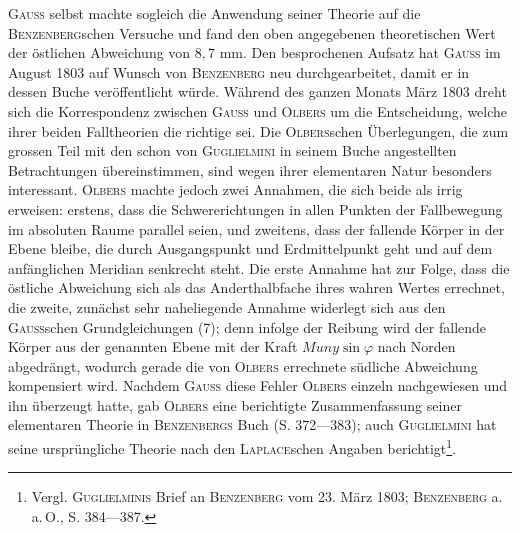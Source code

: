 \textsc{Gauss} selbst machte sogleich die Anwendung seiner Theorie auf die
\textsc{Benzenberg}schen Versuche und fand den oben angegebenen theoretischen Wert
der östlichen Abweichung von $8{,}7$ mm. Den besprochenen Aufsatz hat \textsc{Gauss}
im August 1803 auf Wunsch von \textsc{Benzenberg} neu durchgearbeitet, damit er
in dessen Buche veröffentlicht würde. Während des ganzen Monats März 1803
dreht sich die Korrespondenz zwischen \textsc{Gauss} und \textsc{Olbers} um die Entscheidung,
welche ihrer beiden Falltheorien die richtige sei. Die \textsc{Olbers}schen
Überlegungen, die zum grossen Teil mit den schon von \textsc{Guglielmini} in seinem
Buche angestellten Betrachtungen übereinstimmen, sind wegen ihrer elementaren
Natur besonders interessant. \textsc{Olbers} machte jedoch zwei Annahmen,
die sich beide als irrig erweisen: erstens, dass die Schwererichtungen in allen
Punkten der Fallbewegung im absoluten Raume parallel seien, und zweitens,
dass der fallende Körper in der Ebene bleibe, die durch Ausgangspunkt und
Erdmittelpunkt geht und auf dem anfänglichen Meridian senkrecht steht. Die
erste Annahme hat zur Folge, dass die östliche Abweichung sich als das
Anderthalbfache ihres wahren Wertes errechnet, die zweite, zunächst sehr naheliegende
Annahme widerlegt sich aus den \textsc{Gauss}schen Grundgleichungen (7);
denn infolge der Reibung wird der fallende Körper aus der genannten Ebene
mit der Kraft $Muny\sin\varphi$ nach Norden abgedrängt, wodurch gerade die von
\textsc{Olbers} errechnete südliche Abweichung kompensiert wird. Nachdem \textsc{Gauss}
diese Fehler \textsc{Olbers} einzeln nachgewiesen und ihn überzeugt hatte, gab \textsc{Olbers}
eine berichtigte Zusammenfassung seiner elementaren Theorie in \textsc{Benzenbergs}
Buch (S. 372—383); auch \textsc{Guglielmini} hat seine ursprüngliche Theorie nach
den \textsc{Laplace}schen Angaben berichtigt\footnote{Vergl. \textsc{Guglielminis} Brief an \textsc{Benzenberg} vom 23. März 1803; \textsc{Benzenberg} a.\,a.\,O., S. 384—387.}.
\clearpage\endgroup
